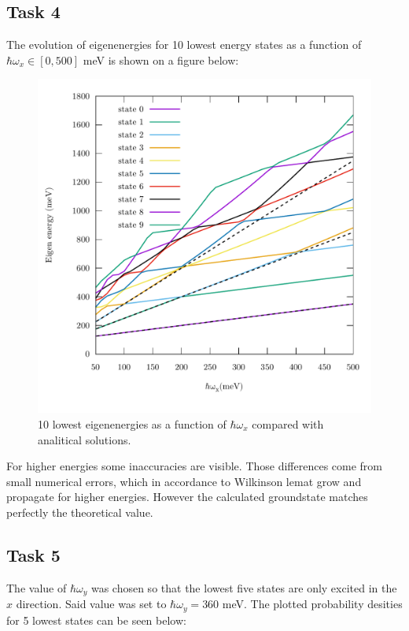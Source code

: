 \documentclass[12pt,a4]{article}
\begin{document}
\subsection*{Task 4}

The evolution of eigenenergies for 10 lowest energy states as a function of $ \hbar\omega_x \in [0,500] $ meV is shown on a figure below:

\begin{figure}[H]
	\includegraphics[width=\textwidth]{../plots/E_omega.pdf}
	\caption{10 lowest eigenenergies as a function of $ \hbar\omega_x $ compared with analitical solutions.}
\end{figure}

For higher energies some inaccuracies are visible. Those differences come from small numerical errors, which in accordance to Wilkinson lemat grow and propagate for higher energies. However the calculated groundstate matches perfectly the theoretical value.

\subsection*{Task 5}

The value of $ \hbar\omega_y $ was chosen so that the lowest five states are only excited in the $ x $ direction. Said value was set to $ \hbar\omega_y = 360 $ meV. The plotted probability desities for 5 lowest states can be seen below: 
\end{document}
